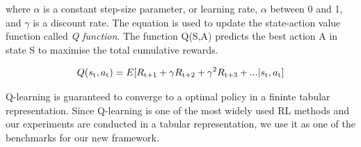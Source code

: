 \documentclass[12pt,twoside]{report}
\theoremstyle{plain}
\theoremstyle{definition}
\begin{document}
where $\alpha$ is a constant step-size parameter, or learning rate, $\alpha$ between 0 and 1,  and $\gamma$ is a discount rate. The equation is used to update the state-action value function called \textit{Q function}. The function Q(S,A) predicts the best action A in state S to maximise the total cumulative rewards.




\begin{equation}
Q(s\textsubscript{t},a\textsubscript{t}) = E [R\textsubscript{t+1} + \gamma R\textsubscript{t+2} + \gamma^2 R\textsubscript{t+3} + ... \vert s\textsubscript{t},a\textsubscript{t} ]
\end{equation}

Q-learning is guaranteed to converge to a optimal policy in a fininte tabular representation.
Since Q-learning is one of the most widely used RL methods and our experiments are conducted in a tabular representation, we use it as one of the benchmarks for our new framework.


\end{document}
